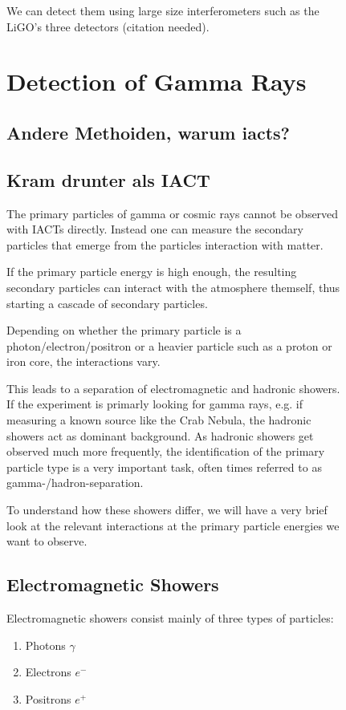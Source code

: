 \begin{figure}
We can detect them using large size interferometers such as
the LiGO's three detectors (citation needed).
\fi



\section{Detection of Gamma Rays}

\subsection{Andere Methoiden, warum iacts?}
\subsection{Kram drunter als IACT}
The primary particles of gamma or cosmic rays cannot be 
observed with IACTs directly. Instead one can measure the secondary particles
that emerge from the particles interaction with matter.

If the primary particle energy is high enough, the resulting 
secondary
particles can interact with the atmosphere themself, thus starting a 
cascade of secondary particles.

Depending on whether the primary particle is 
a photon/electron/positron or a heavier particle such as a proton 
or iron core, the interactions vary.

This leads to a separation of electromagnetic and hadronic showers.
If the experiment is primarly looking for 
gamma rays, e.g. if measuring a known source like the Crab Nebula, 
the hadronic showers act as dominant background.
As hadronic showers get observed much more frequently, 
the identification of the primary particle type is a very important 
task, often times referred to as gamma-/hadron-separation.

To understand how these showers differ, we will have a very brief look
at the relevant interactions at the primary particle energies
we want to observe.

\subsection{Electromagnetic Showers}
Electromagnetic showers consist mainly of three types of particles:
\begin{enumerate}
	\item{Photons $\gamma$}
	\item{Electrons $e^-$}
	\item{Positrons $e^+$}
\end{enumerate}


\end{figure}
